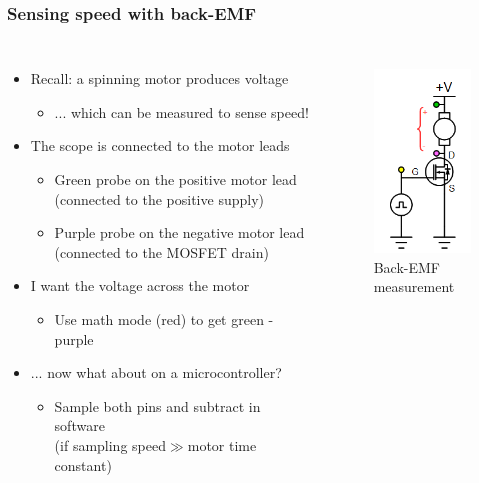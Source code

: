 \documentclass{beamer}
\begin{document}
\begin{frame}
\frametitle{Sensing speed with back-EMF}
\begin{columns}[t]
\begin{itemize}
  \item Recall: a spinning motor produces voltage
  \begin{itemize}
    \item ... which can be measured to sense speed!
  \end{itemize}
  \item The scope is connected to the motor leads
  \begin{itemize} %
    \item Green probe on the positive motor lead (connected to the positive supply)
    \item Purple probe on the negative motor lead (connected to the MOSFET drain)
  \end{itemize}
  \item I want the voltage across the motor
  \begin{itemize}
    \item Use math mode (red) to get green - purple
  \end{itemize}
  \item<2-> ... now what about on a microcontroller?
  \begin{itemize}
    \item Sample both pins and subtract in software \\ (if sampling speed$\gg$motor time constant)
  \end{itemize}
\end{itemize}

\begin{figure}
  \centering
  \includegraphics[scale=0.33]{images-dis3/driverckt-lowside-emf} \\
  Back-EMF measurement
\end{figure}
\end{columns}
\end{frame}
\end{document}
